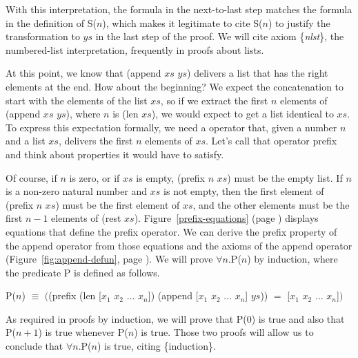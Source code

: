 With this interpretation, the formula in the next-to-last step
matches the formula in the definition of S($n$),
which makes it legitimate to cite S($n$) to justify
the transformation to $ys$ in the last step of the proof.
We will cite axiom \{\emph{nlst}\}, the numbered-list interpretation,
frequently in proofs about lists.

At this point, we know that (append $xs$ $ys$) delivers
a list that has the right elements at the end.
How about the beginning?
We expect the concatenation to start with the elements of the list $xs$,
so if we extract the first $n$ elements of (append $xs$ $ys$), where $n$ is (len $xs$),
we would expect to get a list identical to $xs$.
To express this expectation formally, we need a operator that,
given a number $n$ and a list $xs$, delivers the first $n$ elements of $xs$.
Let's call that operator \textsf{prefix} and think about properties it would have to satisfy.

Of course, if $n$ is zero, or if $xs$ is empty,
\textsf{(prefix $n$ $xs$)} must be the empty list.
If $n$ is a non-zero natural number and $xs$ is not empty,
then the first element of \textsf{(prefix $n$ $xs$)} must be the first element of $xs$,
and the other elements must be the first $n-1$ elements of (rest $xs$).
Figure~\ref{prefix-equations} (page \pageref{prefix-equations}) displays
equations that define the \textsf{prefix} operator.
We can derive the prefix property of the \textsf{append} operator
from those equations and the axioms of the \textsf{append} operator
(Figure~\ref{fig:append-defun}, page \pageref{fig:append-defun}).
We will prove $\forall n.$P($n$) by induction,
where the predicate P is defined as follows.

\begin{samepage}
\begin{center}
P($n$) $\equiv$ $($\textsf{(prefix (len [$x_1$ $x_2$ $\dots$ $x_n$]) (append [$x_1$ $x_2$ $\dots$ $x_n$] $ys$))}
                $=$ \textsf{[$x_1$ $x_2$ $\dots$ $x_n$]}$)$
\end{center}
\end{samepage}

As required in proofs by induction, we will prove that P(0) is true
and also that P($n+1$) is true whenever P($n$) is true.
Those two proofs will allow us to conclude that
$\forall n.$P($n$) is true, citing \{induction\}.

